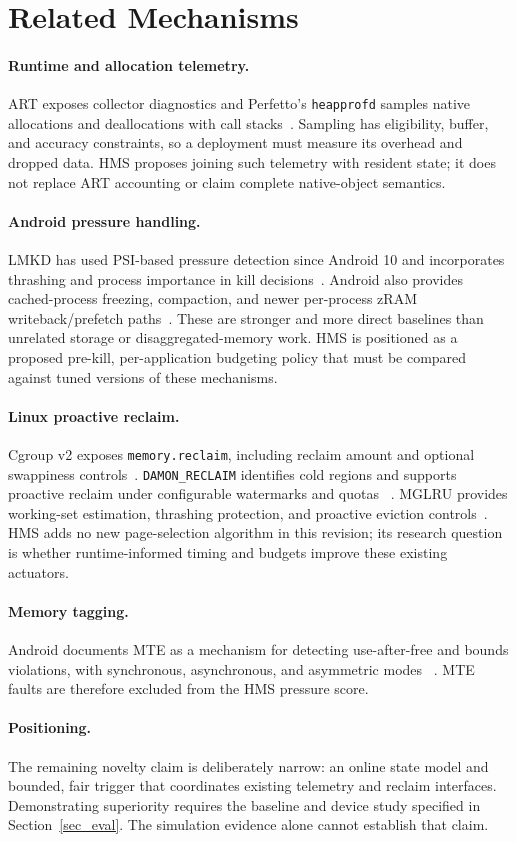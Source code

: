 \section{Related Mechanisms}
\label{sec_related}
\paragraph{Runtime and allocation telemetry.}
ART exposes collector diagnostics and Perfetto's \texttt{heap\-profd} samples native
allocations and deallocations with call stacks~\cite{AOSP_ART_GC,Perfetto_Heapprofd}.
Sampling has eligibility, buffer, and accuracy constraints, so a deployment must
measure its overhead and dropped data. HMS proposes joining such telemetry with
resident state; it does not replace ART accounting or claim complete native-object
semantics.

\paragraph{Android pressure handling.}
LMKD has used PSI-based pressure detection since Android 10 and incorporates
thrashing and process importance in kill decisions~\cite{AOSP_LMKD}. Android also
provides cached-process freezing, compaction, and newer per-process zRAM
writeback/prefetch paths~\cite{AOSP_CachedApps,AOSP_MMD}. These are stronger and
more direct baselines than unrelated storage or disaggregated-memory work. HMS is
positioned as a proposed pre-kill, per-application budgeting policy that must be
compared against tuned versions of these mechanisms.

\paragraph{Linux proactive reclaim.}
Cgroup v2 exposes \texttt{memory.reclaim}, including reclaim amount and optional
swappiness controls~\cite{Linux_CgroupV2}. \texttt{DAMON\_RECLAIM} identifies cold regions
and supports proactive reclaim under configurable watermarks and quotas
~\cite{Linux_DAMONReclaim}. MGLRU provides working-set estimation, thrashing
protection, and proactive eviction controls~\cite{Linux_MGLRU}. HMS adds no new
page-selection algorithm in this revision; its research question is whether
runtime-informed timing and budgets improve these existing actuators.

\paragraph{Memory tagging.}
Android documents MTE as a mechanism for detecting use-after-free and bounds
violations, with synchronous, asynchronous, and asymmetric modes
~\cite{AOSP_MTE}. MTE faults are therefore excluded from the HMS pressure score.

\paragraph{Positioning.}
The remaining novelty claim is deliberately narrow: an online state model and
bounded, fair trigger that coordinates existing telemetry and reclaim interfaces.
Demonstrating superiority requires the baseline and device study specified in
Section~\ref{sec_eval}. The simulation evidence alone cannot establish that claim.
